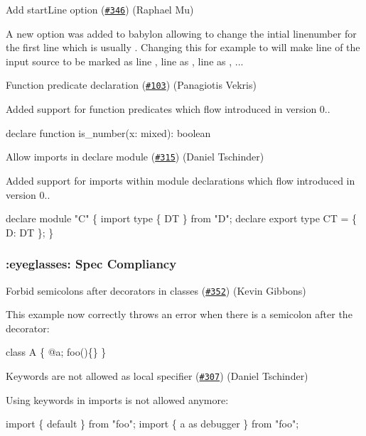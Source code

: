 Add start\+Line option (\href{https://github.com/babel/babylon/pull/346}{\tt \#346}) (Raphael Mu)

A new option was added to babylon allowing to change the intial linenumber for the first line which is usually {}. Changing this for example to {} will make line {} of the input source to be marked as line {}, line {} as {}, line {} as {}, ...

Function predicate declaration (\href{https://github.com/babel/babylon/pull/103}{\tt \#103}) (Panagiotis Vekris)

Added support for function predicates which flow introduced in version 0..


\begin{DoxyCode}
declare function is\_number(x: mixed): boolean %
\end{DoxyCode}


Allow imports in declare module (\href{https://github.com/babel/babylon/pull/315}{\tt \#315}) (Daniel Tschinder)

Added support for imports within module declarations which flow introduced in version 0..


\begin{DoxyCode}
declare module "C" \{
  import type \{ DT \} from "D";
  declare export type CT = \{ D: DT \};
\}
\end{DoxyCode}


\subsubsection*{\+:eyeglasses\+: Spec Compliancy}

Forbid semicolons after decorators in classes (\href{https://github.com/babel/babylon/pull/352}{\tt \#352}) (Kevin Gibbons)

This example now correctly throws an error when there is a semicolon after the decorator\+:


\begin{DoxyCode}
class A \{
@a;
foo()\{\}
\}
\end{DoxyCode}


Keywords are not allowed as local specifier (\href{https://github.com/babel/babylon/pull/307}{\tt \#307}) (Daniel Tschinder)

Using keywords in imports is not allowed anymore\+:


\begin{DoxyCode}
import \{ default \} from "foo";
import \{ a as debugger \} from "foo";
\end{DoxyCode}


